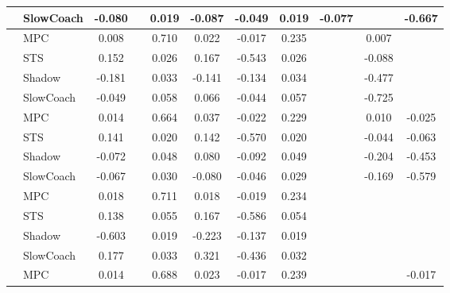 \begin{tabular}{|l|l|*{9}{c|}}
                                                           & SlowCoach &   -0.080 &        &     0.019 & -0.087 & -0.049 &  0.019 &  -0.077 &      &   -0.667 \\
\midrule
[True, False, True, True, True, True, False, True, False] & MPC &    0.008 &        &     0.710 &  0.022 & -0.017 &  0.235 &      &   0.007 &       \\
                                                           & STS &    0.152 &        &     0.026 &  0.167 & -0.543 &  0.026 &      &  -0.088 &       \\
                                                           & Shadow &   -0.181 &        &     0.033 & -0.141 & -0.134 &  0.034 &      &  -0.477 &       \\
                                                           & SlowCoach &   -0.049 &        &     0.058 &  0.066 & -0.044 &  0.057 &      &  -0.725 &       \\
\midrule
[True, False, True, True, True, True, False, True, True] & MPC &    0.014 &        &     0.664 &  0.037 & -0.022 &  0.229 &      &   0.010 &   -0.025 \\
                                                           & STS &    0.141 &        &     0.020 &  0.142 & -0.570 &  0.020 &      &  -0.044 &   -0.063 \\
                                                           & Shadow &   -0.072 &        &     0.048 &  0.080 & -0.092 &  0.049 &      &  -0.204 &   -0.453 \\
                                                           & SlowCoach &   -0.067 &        &     0.030 & -0.080 & -0.046 &  0.029 &      &  -0.169 &   -0.579 \\
\midrule
[True, False, True, True, True, True, False, False, False] & MPC &    0.018 &        &     0.711 &  0.018 & -0.019 &  0.234 &      &      &       \\
                                                           & STS &    0.138 &        &     0.055 &  0.167 & -0.586 &  0.054 &      &      &       \\
                                                           & Shadow &   -0.603 &        &     0.019 & -0.223 & -0.137 &  0.019 &      &      &       \\
                                                           & SlowCoach &    0.177 &        &     0.033 &  0.321 & -0.436 &  0.032 &      &      &       \\
\midrule
[True, False, True, True, True, True, False, False, True] & MPC &    0.014 &        &     0.688 &  0.023 & -0.017 &  0.239 &      &      &   -0.017 \\

\end{tabular}

